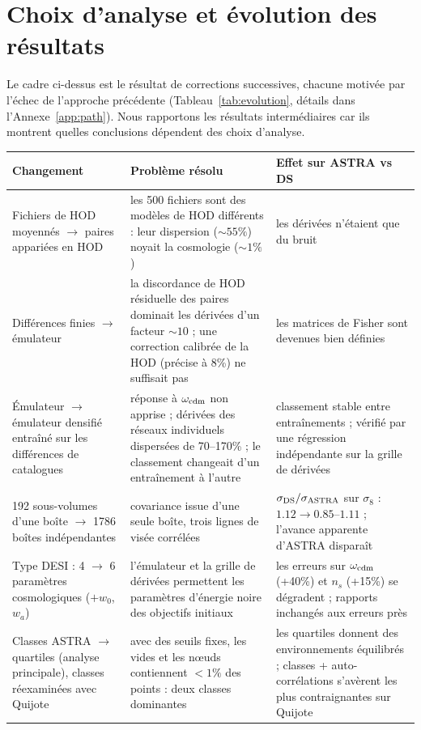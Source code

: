 \documentclass[11pt,twocolumn]{article}
\begin{document}
\section{Choix d'analyse et évolution des résultats}
\label{sec:choices}

Le cadre ci-dessus est le résultat de corrections successives, chacune motivée par l'échec de l'approche précédente (Tableau~\ref{tab:evolution}, détails dans l'Annexe~\ref{app:path}). Nous rapportons les résultats intermédiaires car ils montrent quelles conclusions dépendent des choix d'analyse.

\begin{table}[!tp]
\centering\small
\begin{tabular}{p{4.2cm}p{6.3cm}p{6.3cm}}
\toprule
Changement & Problème résolu & Effet sur ASTRA vs DS \\
\midrule
Fichiers de HOD moyennés $\to$ paires appariées en HOD & les 500 fichiers sont des modèles de HOD différents : leur dispersion ($\sim55\%$) noyait la cosmologie ($\sim1\%$) & les dérivées n'étaient que du bruit \\
Différences finies $\to$ émulateur & la discordance de HOD résiduelle des paires dominait les dérivées d'un facteur $\sim10$ ; une correction calibrée de la HOD (précise à 8\%) ne suffisait pas & les matrices de Fisher sont devenues bien définies \\
Émulateur $\to$ émulateur densifié entraîné sur les différences de catalogues & réponse à $\omega_{\rm cdm}$ non apprise ; dérivées des réseaux individuels dispersées de 70--170\% ; le classement changeait d'un entraînement à l'autre & classement stable entre entraînements ; vérifié par une régression indépendante sur la grille de dérivées \\
192 sous-volumes d'une boîte $\to$ 1786 boîtes indépendantes & covariance issue d'une seule boîte, trois lignes de visée corrélées & $\sigma_{\rm DS}/\sigma_{\rm ASTRA}$ sur $\sigma_8$ : $1.12\to0.85$--$1.11$ ; l'avance apparente d'ASTRA disparaît \\
Type DESI : 4 $\to$ 6 paramètres cosmologiques ($+w_0$, $w_a$) & l'émulateur et la grille de dérivées permettent les paramètres d'énergie noire des objectifs initiaux & les erreurs sur $\omega_{\rm cdm}$ (+40\%) et $n_s$ (+15\%) se dégradent ; rapports inchangés aux erreurs près \\
Classes ASTRA $\to$ quartiles (analyse principale), classes réexaminées avec Quijote & avec des seuils fixes, les vides et les nœuds contiennent $<1\%$ des points : deux classes dominantes & les quartiles donnent des environnements équilibrés ; classes + auto-corrélations s'avèrent les plus contraignantes sur Quijote \\

\end{tabular}
\end{table}
\end{document}
